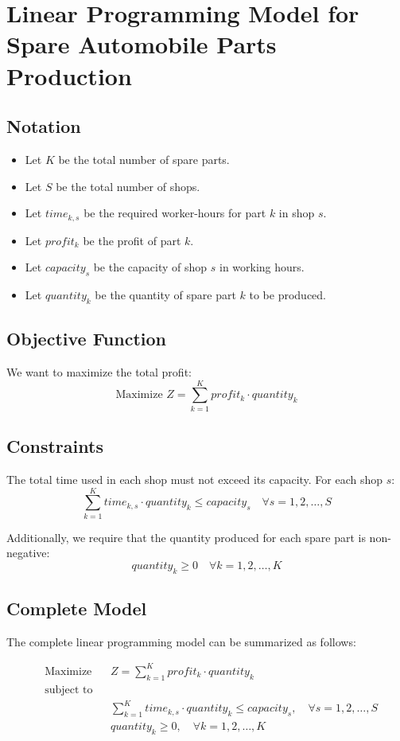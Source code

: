 \documentclass{article}
\begin{document}
\section*{Linear Programming Model for Spare Automobile Parts Production}

\subsection*{Notation}
\begin{itemize}
    \item Let \( K \) be the total number of spare parts.
    \item Let \( S \) be the total number of shops.
    \item Let \( time_{k,s} \) be the required worker-hours for part \( k \) in shop \( s \).
    \item Let \( profit_k \) be the profit of part \( k \).
    \item Let \( capacity_s \) be the capacity of shop \( s \) in working hours.
    \item Let \( quantity_k \) be the quantity of spare part \( k \) to be produced.
\end{itemize}

\subsection*{Objective Function}
We want to maximize the total profit:
\[
\text{Maximize } Z = \sum_{k=1}^{K} profit_k \cdot quantity_k
\]

\subsection*{Constraints}
The total time used in each shop must not exceed its capacity. For each shop \( s \):
\[
\sum_{k=1}^{K} time_{k,s} \cdot quantity_k \leq capacity_s \quad \forall s = 1, 2, \ldots, S
\]

Additionally, we require that the quantity produced for each spare part is non-negative:
\[
quantity_k \geq 0 \quad \forall k = 1, 2, \ldots, K
\]

\subsection*{Complete Model}
The complete linear programming model can be summarized as follows:

\[
\begin{aligned}
& \text{Maximize} && Z = \sum_{k=1}^{K} profit_k \cdot quantity_k \\
& \text{subject to} \\
& && \sum_{k=1}^{K} time_{k,s} \cdot quantity_k \leq capacity_s, \quad \forall s = 1, 2, \ldots, S \\
& && quantity_k \geq 0, \quad \forall k = 1, 2, \ldots, K 
\end{aligned}
\]
\end{document}
